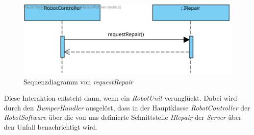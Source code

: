\begin{figure}[H]
	\centering
	\includegraphics[width=1\textwidth]{img/8-requestRepair}
	\caption{Sequenzdiagramm von \emph{requestRepair}}
	\label{requestRepairInteraktion}
\end{figure}

Diese Interaktion entsteht dann, wenn ein \textit{RobotUnit} verunglückt. Dabei wird durch den \textit{BumperHandler} ausgelöst, dass in der Hauptklasse \textit{RobotController} der \textit{RobotSoftware} über die von uns definierte Schnittstelle \textit{IRepair} der \textit{Server} über den Unfall benachrichtigt wird.\\
